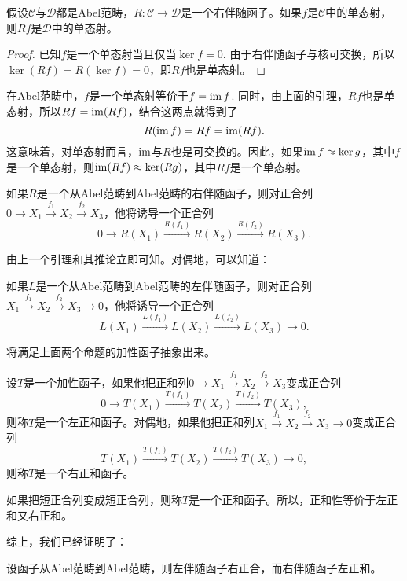 \begin{lem}
假设$\mathcal{C}$与$\mathcal{D}$都是Abel范畴，$R:\mathcal{C}\to \mathcal{D}$是一个右伴随函子。如果$f$是$\mathcal{C}$中的单态射，则$Rf$是$\mathcal{D}$中的单态射。
\end{lem}

\begin{proof}
已知$f$是一个单态射当且仅当$\ker f=0$. 由于右伴随函子与核可交换，所以$\ker(Rf)= R(\ker f)=0$，即$Rf$也是单态射。
\end{proof}

在Abel范畴中，$f$是一个单态射等价于$f=\operatorname{im} f$. 同时，由上面的引理，$Rf$也是单态射，所以$Rf=\operatorname{im}(Rf)$，结合这两点就得到了
\[
	R(\operatorname{im} f)=Rf=\operatorname{im}(Rf).
\]
这意味着，对单态射而言，$\operatorname{im}$与$R$也是可交换的。因此，如果$\operatorname{im} f\approx \ker g$，其中$f$是一个单态射，则$\operatorname{im}(Rf)\approx \ker(Rg)$，其中$Rf$是一个单态射。

\begin{pro}
如果$R$是一个从Abel范畴到Abel范畴的右伴随函子，则对正合列$0\to X_1\xrightarrow{f_1} X_2\xrightarrow{f_2} X_3$，他将诱导一个正合列
\[
	0\to R(X_1)\xrightarrow{R(f_1)} R(X_2)\xrightarrow{R(f_2)} R(X_3).
\]
\end{pro}

由上一个引理和其推论立即可知。对偶地，可以知道：

\begin{pro}
如果$L$是一个从Abel范畴到Abel范畴的左伴随函子，则对正合列$X_1\xrightarrow{f_1} X_2\xrightarrow{f_2} X_3 \to 0$，他将诱导一个正合列
\[
	L(X_1)\xrightarrow{L(f_1)} L(X_2)\xrightarrow{L(f_2)} L(X_3) \to 0.
\]
\end{pro}

将满足上面两个命题的加性函子抽象出来。

\begin{para}
设$T$是一个加性函子，如果他把正和列$0\to X_1\xrightarrow{f_1} X_2\xrightarrow{f_2} X_3$变成正合列
\[
	0\to T(X_1)\xrightarrow{T(f_1)} T(X_2)\xrightarrow{T(f_2)} T(X_3),
\]
则称$T$是一个左正和函子。对偶地，如果他把正和列$X_1\xrightarrow{f_1} X_2\xrightarrow{f_2} X_3\to 0$变成正合列
\[
	T(X_1)\xrightarrow{T(f_1)} T(X_2)\xrightarrow{T(f_2)} T(X_3)\to 0,
\]
则称$T$是一个右正和函子。

如果把短正合列变成短正合列，则称$T$是一个正和函子。所以，正和性等价于左正和又右正和。
\end{para}

综上，我们已经证明了：

\begin{thm}
设函子从Abel范畴到Abel范畴，则左伴随函子右正合，而右伴随函子左正和。
\end{thm}

